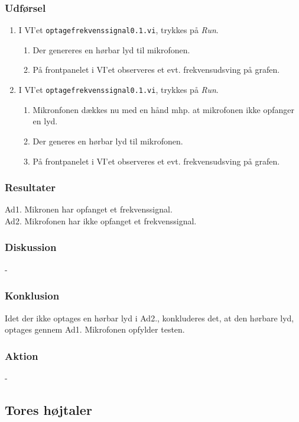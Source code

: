 		\subsubsection{Udførsel}
			\begin{enumerate}
				\item I VI'et \texttt{optagefrekvenssignal0.1.vi}, trykkes på \textit{Run}.  
				\begin{enumerate}
				\item Der genereres en hørbar lyd til mikrofonen. 
				\item På frontpanelet i VI'et observeres et evt. frekvensudsving på grafen.
				\end{enumerate}
				\item I VI'et \texttt{optagefrekvenssignal0.1.vi}, trykkes på \textit{Run}. 
				\begin{enumerate}
				\item Mikronfonen dækkes nu med en hånd mhp. at mikrofonen ikke opfanger en lyd. 
				\item Der generes en hørbar lyd til mikrofonen. 
				\item På frontpanelet i VI'et observeres et evt. frekvensudsving på grafen.
				\end{enumerate}
			\end{enumerate}
			
		\subsubsection{Resultater}
		Ad1. Mikronen har opfanget et frekvenssignal. \\
		Ad2. Mikrofonen har ikke opfanget et frekvenssignal. 
		
		\subsubsection{Diskussion} 
		-
		\subsubsection{Konklusion}
		Idet der ikke optages en hørbar lyd i Ad2., konkluderes det, at den hørbare lyd, optages gennem Ad1. 
		Mikrofonen opfylder testen. 
		\subsubsection{Aktion}
		- 
	
	\subsection{Tores højtaler}
